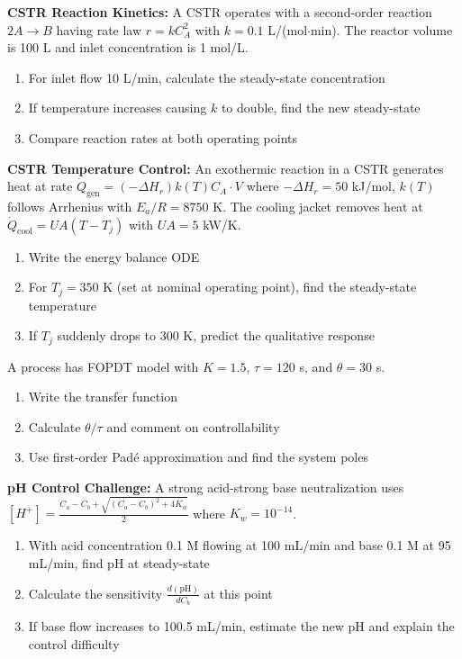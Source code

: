 \begin{exercise}
\textbf{CSTR Reaction Kinetics:} A CSTR operates with a second-order reaction $2A \to B$ having rate law $r = kC_A^2$ with $k = 0.1$ L/(mol$\cdot$min). The reactor volume is 100 L and inlet concentration is 1 mol/L.
\begin{enumerate}[label=(\alph*)]
    \item For inlet flow 10 L/min, calculate the steady-state concentration
    \item If temperature increases causing $k$ to double, find the new steady-state
    \item Compare reaction rates at both operating points
\end{enumerate}
\end{exercise}

\begin{exercise}
\textbf{CSTR Temperature Control:} An exothermic reaction in a CSTR generates heat at rate $\dot{Q}_{\text{gen}} = (-\Delta H_r)k(T)C_A \cdot V$ where $-\Delta H_r = 50$ kJ/mol, $k(T)$ follows Arrhenius with $E_a/R = 8750$ K. The cooling jacket removes heat at $\dot{Q}_{\text{cool}} = UA(T - T_j)$ with $UA = 5$ kW/K.
\begin{enumerate}[label=(\alph*)]
    \item Write the energy balance ODE
    \item For $T_j = 350$ K (set at nominal operating point), find the steady-state temperature
    \item If $T_j$ suddenly drops to 300 K, predict the qualitative response
\end{enumerate}
\end{exercise}

\begin{exercise}
A process has FOPDT model with $K = 1.5$, $\tau = 120$ s, and $\theta = 30$ s.
\begin{enumerate}[label=(\alph*)]
    \item Write the transfer function
    \item Calculate $\theta/\tau$ and comment on controllability
    \item Use first-order Padé approximation and find the system poles
\end{enumerate}
\end{exercise}

\begin{exercise}
\textbf{pH Control Challenge:} A strong acid-strong base neutralization uses $[H^+] = \frac{C_a - C_b + \sqrt{(C_a - C_b)^2 + 4K_w}}{2}$ where $K_w = 10^{-14}$.
\begin{enumerate}[label=(\alph*)]
    \item With acid concentration 0.1 M flowing at 100 mL/min and base 0.1 M at 95 mL/min, find pH at steady-state
    \item Calculate the sensitivity $\frac{d(\text{pH})}{dC_b}$ at this point
    \item If base flow increases to 100.5 mL/min, estimate the new pH and explain the control difficulty
\end{enumerate}
\end{exercise}
